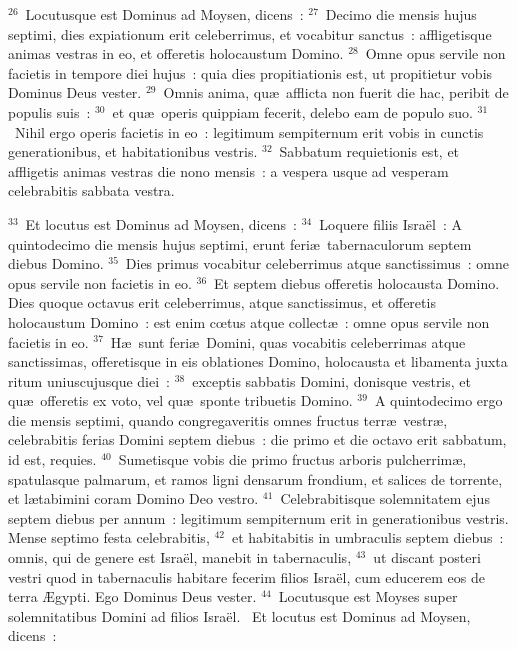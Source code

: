 ${}^{26}$~Locutusque est Dominus ad Moysen, dicens~:
${}^{27}$~Decimo die mensis hujus septimi, dies expiationum erit celeberrimus, et vocabitur sanctus~: affligetisque animas vestras in eo, et offeretis holocaustum Domino.
${}^{28}$~Omne opus servile non facietis in tempore diei hujus~: quia dies propitiationis est, ut propitietur vobis Dominus Deus vester.
${}^{29}$~Omnis anima, qu\ae\ afflicta non fuerit die hac, peribit de populis suis~:
${}^{30}$~et qu\ae\ operis quippiam fecerit, delebo eam de populo suo.
${}^{31}$~Nihil ergo operis facietis in eo~: legitimum sempiternum erit vobis in cunctis generationibus, et habitationibus vestris.
${}^{32}$~Sabbatum requietionis est, et affligetis animas vestras die nono mensis~: a vespera usque ad vesperam celebrabitis sabbata vestra.


${}^{33}$~Et locutus est Dominus ad Moysen, dicens~:
${}^{34}$~Loquere filiis Isra\"el~: A quintodecimo die mensis hujus septimi, erunt feri\ae\ tabernaculorum septem diebus Domino.
${}^{35}$~Dies primus vocabitur celeberrimus atque sanctissimus~: omne opus servile non facietis in eo.
${}^{36}$~Et septem diebus offeretis holocausta Domino. Dies quoque octavus erit celeberrimus, atque sanctissimus, et offeretis holocaustum Domino~: est enim cœtus atque collect\ae~: omne opus servile non facietis in eo.
${}^{37}$~H\ae\ sunt feri\ae\ Domini, quas vocabitis celeberrimas atque sanctissimas, offeretisque in eis oblationes Domino, holocausta et libamenta juxta ritum uniuscujusque diei~:
${}^{38}$~exceptis sabbatis Domini, donisque vestris, et qu\ae\ offeretis ex voto, vel qu\ae\ sponte tribuetis Domino.
${}^{39}$~A quintodecimo ergo die mensis septimi, quando congregaveritis omnes fructus terr\ae\ vestr\ae , celebrabitis ferias Domini septem diebus~: die primo et die octavo erit sabbatum, id est, requies.
${}^{40}$~Sumetisque vobis die primo fructus arboris pulcherrim\ae , spatulasque palmarum, et ramos ligni densarum frondium, et salices de torrente, et l\ae tabimini coram Domino Deo vestro.
${}^{41}$~Celebrabitisque solemnitatem ejus septem diebus per annum~: legitimum sempiternum erit in generationibus vestris. Mense septimo festa celebrabitis,
${}^{42}$~et habitabitis in umbraculis septem diebus~: omnis, qui de genere est Isra\"el, manebit in tabernaculis,
${}^{43}$~ut discant posteri vestri quod in tabernaculis habitare fecerim filios Isra\"el, cum educerem eos de terra \AE gypti. Ego Dominus Deus vester.
${}^{44}$~Locutusque est Moyses super solemnitatibus Domini ad filios Isra\"el.
~\lettrine[lines=10,image=true,loversize=0.05,lraise=-0.03]{E}{}t locutus est Dominus ad Moysen, dicens~:
